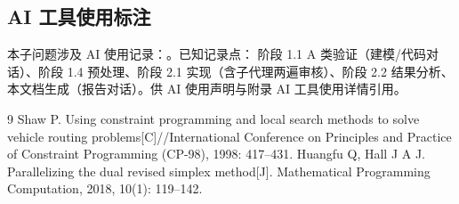 \documentclass{internal-report}
\begin{document}
\subsection{AI 工具使用标注}

本子问题涉及 AI 使用记录：。已知记录点：
阶段 1.1 A 类验证（建模/代码对话）、阶段 1.4 预处理、阶段 2.1 实现（含子代理两遍审核）、阶段 2.2
结果分析、本文档生成（报告对话）。供 AI 使用声明与附录 AI 工具使用详情引用。

\begin{thebibliography}{9}
 Shaw P. Using constraint programming and local search methods to solve vehicle
routing problems[C]//International Conference on Principles and Practice of Constraint Programming
(CP-98), 1998: 417--431.
 Huangfu Q, Hall J A J. Parallelizing the dual revised simplex method[J].
Mathematical Programming Computation, 2018, 10(1): 119--142.
\end{thebibliography}
\end{document}
